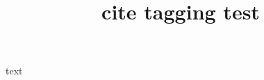 \documentclass{article}
\title{cite tagging test}
\begin{document}
text \cite{inbook-full,article-full,mastersthesis-full}

\cite[postfix]{inproceedings-full}




\end{document}

